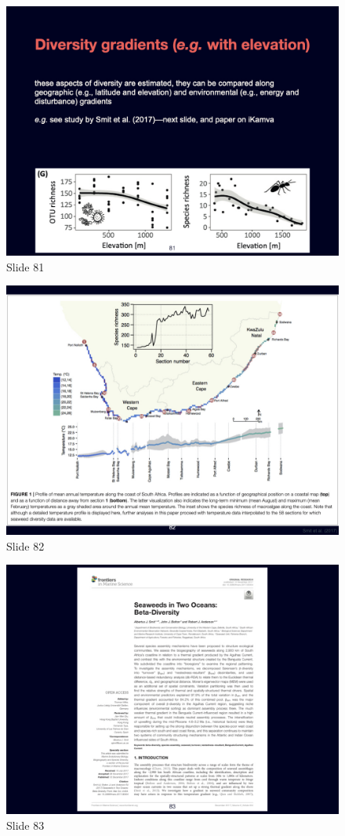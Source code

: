 \documentclass[
  12pt,
]{book}
\begin{document}
\begin{figure}[ht]
\centering
\includegraphics[width=0.8\linewidth]{../images/BDC334/BDC334-081.jpeg}
\caption*{Slide 81}
\end{figure}

\begin{figure}[ht]
\centering
\includegraphics[width=0.8\linewidth]{../images/BDC334/BDC334-082.jpeg}
\caption*{Slide 82}
\end{figure}

\begin{figure}[ht]
\centering
\includegraphics[width=0.8\linewidth]{../images/BDC334/BDC334-083.jpeg}
\caption*{Slide 83}
\end{figure}
\end{document}
